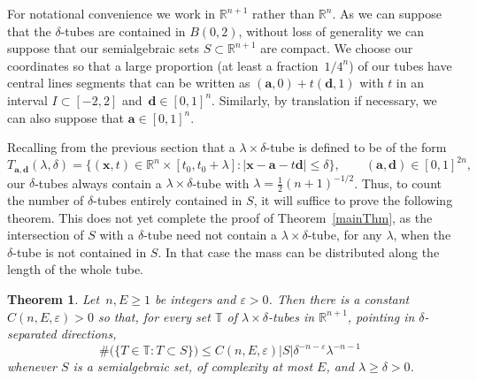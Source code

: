 \documentclass[letterpaper, reqno, 11pt]{amsart}
\newtheorem{thm}{Theorem}[section]
\theoremstyle{remark}
\numberwithin{equation}{section}
\begin{document}
For notational convenience we work in $\mathbb{R}^{n+1}$ rather than $\mathbb{R}^n$. As we can suppose that the $\delta$-tubes are contained in $B(0,2)$,  without loss of generality we can suppose that our semialgebraic sets $S\subset \mathbb{R}^{n+1}$ are compact.   We choose our coordinates so that a large proportion (at least a fraction~$1/4^{n}$) of our tubes have central lines segments that can be written as $(\mathbf{a},0)+t(\mathbf{d},1)$ with $t$ in an interval $I\subset[-2,2]$ and~$\mathbf{d}\in[0,1]^n$. Similarly, by translation if necessary,  we can also suppose that $\mathbf{a}\in[0,1]^n$. 

Recalling from the previous section that a $\lambda\times \delta$-tube is defined to be of the form
$$T_{\mathbf{a},\mathbf{d}}(\lambda,\delta) = \big\{ (\mathbf{x}, t)\in \mathbb{R}^{n}\times[t_0,t_0+\lambda]:  |\mathbf{x} - \mathbf{a} -t \mathbf{d}| \leq \delta\big\},\qquad (\mathbf{a},\mathbf{d})\in[0,1]^{2n},$$
our $\delta$-tubes always contain a $\lambda\times\delta$-tube with $\lambda=\tfrac{1}{2}(n+1)^{-1/2}$. Thus, to count the number of $\delta$-tubes entirely contained in $S$, it will suffice to prove the following theorem. This does not yet complete the proof of Theorem~\ref{mainThm}, as the intersection of $S$ with a $\delta$-tube need not contain a $\lambda\times \delta$-tube, for any $\lambda$, when the $\delta$-tube is not contained in $S$. In that case the mass  can be distributed along the length of the whole tube.

\begin{thm} \label{almostsimple}
Let~$n,E\ge 1$ be integers and $\varepsilon>0$. Then there is a constant $C(n,E,\varepsilon)>0$ so that, for every set $\mathbb{T}$ of $\lambda\times\delta$-tubes in $\mathbb{R}^{n+1}$, pointing in  $\delta$-separated directions, 
\begin{equation}\label{croc}\#\big(\big\{ T \in \mathbb{T} :  T\subset S \big\}\big) \leq C(n,E,\varepsilon) |S| \delta^{-n-\varepsilon} \lambda^{-n-1}\end{equation}
whenever $S$ is a semialgebraic set, of complexity at most $E$, and $\lambda\ge \delta>0$.
\end{thm}
\end{document}
